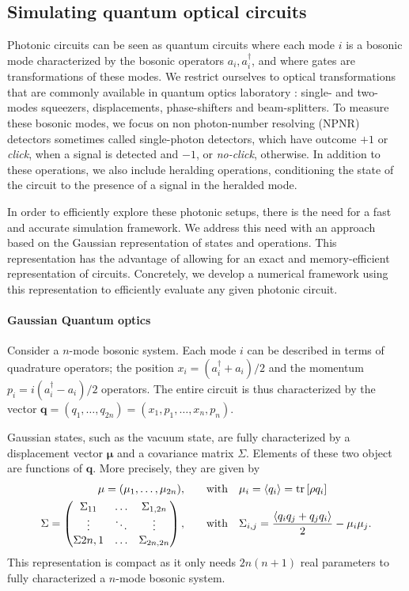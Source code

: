 \subsection{Simulating quantum optical circuits}

Photonic circuits can be seen as quantum circuits where each mode $i$ is a bosonic mode characterized by the bosonic operators $a_i,a_i^\dagger$, and where gates are transformations of these modes.
We restrict ourselves to optical transformations that are commonly available in quantum optics laboratory : single- and two-modes squeezers, displacements, phase-shifters and beam-splitters.
To measure these bosonic modes, we focus on non photon-number resolving (NPNR) detectors sometimes called single-photon detectors, which have outcome $+1$ or \textit{click}, when a signal is detected and $-1$, or \textit{no-click}, otherwise.
In addition to these operations, we also include heralding operations, conditioning the state of the circuit to the presence of a signal in the heralded mode.


In order to efficiently explore these photonic setups, there is the need for a fast and accurate simulation framework.
We address this need with an approach based on the Gaussian representation of states and operations.
This representation has the advantage of allowing for an exact and memory-efficient representation of circuits.
Concretely, we develop a numerical framework using this representation to efficiently evaluate any given photonic circuit.


\paragraph{Gaussian Quantum optics}

Consider a $n$-mode bosonic system. 
Each mode $i$ can be described in terms of quadrature operators; the position $x_i=(a_i^\dagger+a_i)/2$ and the momentum $p_i=i(a_i^\dagger-a_i)/2$ operators.
The entire circuit is thus characterized by the vector $\mathbf{q}=(q_1,\dots,q_{2n})=(x_1,p_1,\dots,x_n,p_n)$.

Gaussian states, such as the vacuum state, are fully characterized by a displacement vector $\mathbf{\mu}$ and a covariance matrix $\Sigma$.
Elements of these two object are functions of $\mathbf{q}$.
More precisely, they are given by
\begin{align}
	\mathbf{\mu} = (\mu_1,\dots,\mu_{2n}), \qquad &\text{with}\quad \mu_i = \mean{q_i} = \trr{\rho q_i} \\
	\Sigma = \begin{pmatrix} \Sigma_{11} & \dots & \Sigma_{1,2n} \\
							\vdots & \ddots & \vdots \\
						\Sigma{2n,1} & \dots & \Sigma_{2n,2n}\end{pmatrix} , \qquad &\text{with}\quad \Sigma_{i,j} = \frac{\mean{q_i q_j + q_j q_i}}{2}-\mu_i \mu_j.
\end{align}
This representation is compact as it only needs $2n(n+1)$ real parameters to fully characterized a $n$-mode bosonic system.

